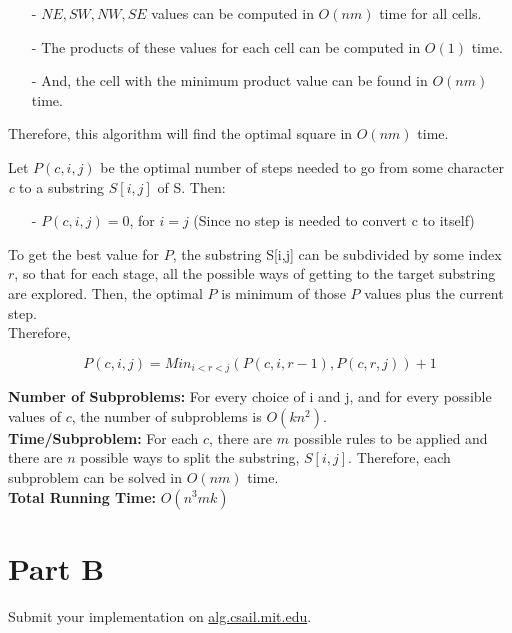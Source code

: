 \documentclass[12pt,twoside]{article}
\begin{document}
\begin{problems}
\begin{problemparts}
\begin{itemize}
	\item[-] $NE, SW, NW, SE$ values can be computed in $O(nm)$ time for all cells. 
	\item[-] The products of these values for each cell can be computed in $O(1)$ time.
	\item[-] And, the cell with the minimum product value can be found in $O(nm)$ time.
\end{itemize}

Therefore, this algorithm will find the optimal square in $O(nm)$ time.



\end{problemparts}

\problem 

\begin{problemparts}
\problempart Let $P(c,i,j)$ be the optimal number of steps needed to go from some character \textit{c} to a substring $S[i,j]$ of S. Then:
\begin{itemize}
	\item[-] $P(c,i,j) = 0$, for $i=j$ (Since no step is needed to convert c to itself)
\end{itemize}

To get the best value for $P$, the substring S[i,j] can be subdivided by some index $r$, so that for each stage, all the possible ways of getting to the target substring are explored. Then, the optimal $P$ is minimum of those $P$ values plus the current step.\\

Therefore, 

\[  P(c,i,j)= Min_{i<r<j}(P(c,i,r-1), P(c,r,j)) + 1 \] 

\problempart 

\textbf{Number of Subproblems:} For every choice of i and j, and for every possible values of $c$, the number of subproblems is $O(kn^2)$.\\

\textbf{Time/Subproblem:} For each $c$, there are $m$ possible rules to be applied and there are $n$ possible ways to split the substring, $S[i,j]$.  Therefore, each subproblem can be solved in $O(nm)$ time.\\

\textbf{Total Running Time:} $O(n^3mk)$


\end{problemparts}

\section*{Part B}

\problem
Submit your implementation on \url{alg.csail.mit.edu}.

\end{problems}
\end{document}
